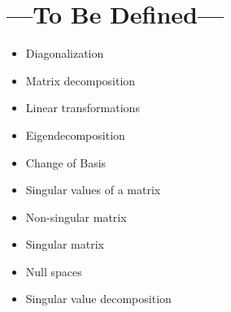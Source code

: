 
\chapter{---To Be Defined---}\label{tbd}
\begin{itemize}
  \item Diagonalization
  \item Matrix decomposition
  \item Linear transformations
  \item Eigendecomposition
  \item Change of Basis
  \item Singular values of a matrix
  \item Non-singular matrix
  \item Singular matrix
  \item Null spaces
  \item Singular value decomposition
\end{itemize}